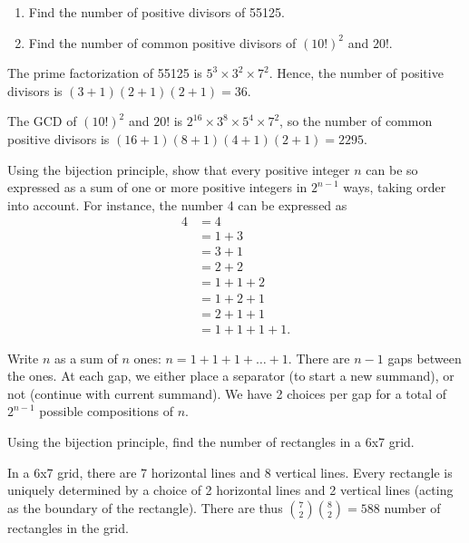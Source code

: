 \begin{problem}
    \begin{enumerate}
        \item Find the number of positive divisors of 55125.
        \item Find the number of common positive divisors of $(10!)^2$ and $20!$.
    \end{enumerate}
\end{problem}
\begin{solution}
    \begin{ppart}
        The prime factorization of 55125 is $5^3 \times 3^2 \times 7^2$. Hence, the number of positive divisors is $(3 + 1)(2 + 1)(2 + 1) = 36$.
    \end{ppart}
    \begin{ppart}
        The GCD of $(10!)^2$ and $20!$ is $2^{16} \times 3^8 \times 5^4 \times 7^2$, so the number of common positive divisors is $(16+1)(8+1)(4+1)(2+1) = 2295$.
    \end{ppart}
\end{solution}

\begin{problem}
    Using the bijection principle, show that every positive integer $n$ can be so expressed as a sum of one or more positive integers in $2^{n-1}$ ways, taking order into account. For instance, the number 4 can be expressed as
    \begin{align*}
        4 &= 4\\
        &= 1 + 3\\
        &= 3 + 1\\
        &= 2 + 2\\
        &= 1 + 1 + 2\\
        &= 1 + 2 + 1\\
        &= 2 + 1 + 1\\
        &= 1 + 1 + 1 + 1.
    \end{align*}
\end{problem}
\begin{solution}
    Write $n$ as a sum of $n$ ones: $n = 1 + 1 + 1 + \dots + 1$. There are $n-1$ gaps between the ones. At each gap, we either place a separator (to start a new summand), or not (continue with current summand). We have 2 choices per gap for a total of $2^{n-1}$ possible compositions of $n$.
\end{solution}

\begin{problem}
    Using the bijection principle, find the number of rectangles in a 6x7 grid.
\end{problem}
\begin{solution}
    In a 6x7 grid, there are 7 horizontal lines and 8 vertical lines. Every rectangle is uniquely determined by a choice of 2 horizontal lines and 2 vertical lines (acting as the boundary of the rectangle). There are thus $\binom{7}{2}\binom{8}{2} = 588$ number of rectangles in the grid.
\end{solution}

